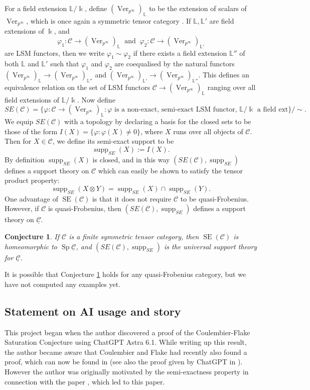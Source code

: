 \documentclass[11pt]{amsart}
\def\Cs{\mathcal{C}}
\def\Cs{\mathscr{C}}
\def\Ver{\operatorname{Ver}}
\def\ul{\underline}
\def\Sp{\operatorname{Sp}}
\newtheorem{conj}[thm]{Conjecture}
\theoremstyle{definition}
\theoremstyle{remark}
\numberwithin{equation}{section}
\begin{document}
For a field extension $\mathbb{L}/\Bbbk$, define $(\Ver_{p^\infty})_{\mathbb{L}}$ to be the extension of scalars of $\Ver_{p^\infty}$, which is once again a symmetric tensor category \cite[Lem.~2.2]{EO}.  If $\mathbb{L},\mathbb{L}'$ are field extensions of $\Bbbk$, and
\[
\varphi_1:\Cs\to(\Ver_{p^\infty})_{\mathbb{L}} \ \text{ and } \ \varphi_2:\Cs\to(\Ver_{p^\infty})_{\mathbb{L}'}
\]
are LSM functors, then we write $\varphi_1\sim\varphi_2$ if there exists a field extension $\mathbb{L}''$ of both $\mathbb{L}$ and $\mathbb{L}'$ such that $\varphi_1$ and $\varphi_2$ are coequalised by the natural functors $(\Ver_{p^\infty})_{\mathbb{L}}\to(\Ver_{p^\infty})_{\mathbb{L}''}$ and $(\Ver_{p^\infty})_{\mathbb{L}'}\to(\Ver_{p^\infty})_{\mathbb{L}''}.$  This defines an equivalence relation on the set of LSM functors $\Cs\to(\Ver_{p^\infty})_{\mathbb{L}}$ ranging over all field extensions of $\mathbb{L}/\Bbbk$.  Now define
\[
SE(\Cs)=\{\varphi:\Cs\to(\Ver_{p^\infty})_{\mathbb{L}}:\varphi\text{ is a non-exact, semi-exact LSM functor, } \mathbb{L}/\Bbbk\text{ a field ext}\}/\sim.
\]
We equip $SE(\Cs)$ with a topology by declaring a basis for the closed sets to be those of the form $I(X)=\{\varphi:\varphi(X)\neq0\}$, where $X$ runs over all objects of $\Cs$.  Then for $X\in\Cs$, we define its semi-exact support to be
\[
\operatorname{supp}_{SE}(X):=I(X).
\]
By definition $\operatorname{supp}_{SE}(X)$ is closed, and in this way $(SE(\Cs),\operatorname{supp}_{SE})$ defines a support theory  on $\Cs$ which can easily be shown to satisfy the tensor product property:
\[
\operatorname{supp}_{SE}(X\otimes Y)=\operatorname{supp}_{SE}(X)\cap\operatorname{supp}_{SE}(Y).
\]
One advantage of $\operatorname{SE}(\Cs)$ is that it does not require $\Cs$ to be quasi-Frobenius. However, if $\Cs$ is quasi-Frobenius, then $(SE(\Cs),\operatorname{supp}_{SE})$ defines a support theory on $\ul{\Cs}$.

\begin{conj}\label{conj 3}
    If $\Cs$ is a finite symmetric tensor category, then $\operatorname{SE}(\Cs)$ is homeomorphic to $\Sp\ul{\Cs}$, and $(SE(\Cs),\operatorname{supp}_{SE})$ is the universal support theory for $\ul{\Cs}$.
\end{conj}

It is possible that Conjecture \ref{conj 3} holds for any quasi-Frobenius category, but we have not computed any examples yet.

\subsection{Statement on AI usage and story} This project began when the author discovered a proof of the Coulembier-Flake Saturation Conjecture using ChatGPT Astra 6.1.  While writing up this result, the author became aware that Coulembier and Flake had recently also found a proof, which can now be found in \cite{CF2} (see also the proof given by ChatGPT in \cite{chatgpt}). However the author was originally motivated by the semi-exactness property in connection with the paper \cite{HKPSYZ}, which led to this paper.
\end{document}
